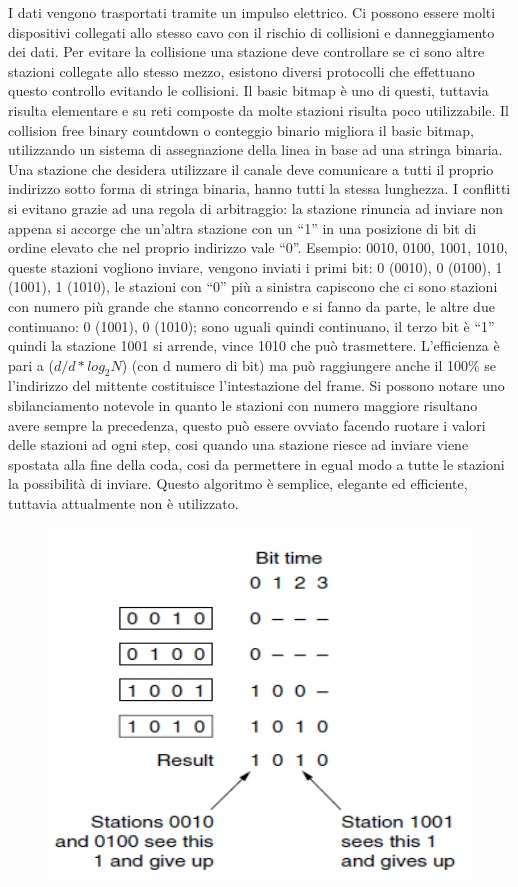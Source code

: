 I dati vengono trasportati tramite un impulso elettrico. Ci possono essere molti dispositivi collegati allo stesso cavo con il rischio di collisioni e danneggiamento dei dati.
Per evitare la collisione una stazione deve controllare se ci sono altre stazioni collegate allo stesso mezzo, esistono diversi protocolli che effettuano questo controllo evitando le collisioni.
Il basic bitmap è uno di questi, tuttavia risulta elementare e su reti composte da molte stazioni risulta poco utilizzabile.
Il collision free binary countdown o conteggio binario migliora il basic bitmap, utilizzando un sistema di assegnazione della linea in base ad una stringa binaria.
Una stazione che desidera utilizzare il canale deve comunicare a tutti il proprio indirizzo sotto forma di stringa binaria, hanno tutti la stessa lunghezza.
I conflitti si evitano grazie ad una regola di arbitraggio: la stazione rinuncia ad inviare non appena si accorge che un’altra stazione con un “1” in una posizione di bit di ordine elevato che nel proprio indirizzo vale “0”.
Esempio: 0010, 0100, 1001, 1010, queste stazioni vogliono inviare, vengono inviati i primi bit: 0 (0010), 0 (0100), 1 (1001), 1 (1010), le stazioni con “0” più a sinistra capiscono che ci sono stazioni con numero più grande che stanno concorrendo e si fanno da parte, le altre due continuano: 0 (1001), 0 (1010); sono uguali quindi continuano, il terzo bit è “1” quindi la stazione 1001 si arrende, vince 1010 che può trasmettere.
L’efficienza è pari a ($d/d*log_2N$) (con d numero di bit) ma può raggiungere anche il 100\% se l’indirizzo del mittente costituisce l’intestazione del frame.
Si possono notare uno sbilanciamento notevole in quanto le stazioni con numero maggiore risultano avere sempre la precedenza, questo può essere ovviato facendo ruotare i valori delle stazioni ad ogni step, cosi quando una stazione riesce ad inviare viene spostata alla fine della coda, cosi da permettere in egual modo a tutte le stazioni la possibilità di inviare.
Questo algoritmo è semplice, elegante ed efficiente, tuttavia attualmente non è utilizzato.

\begin{figure}[H]
\centering
\includegraphics[scale=0.6]{res/img/25_FreeBinaryCountdown.png}
\end{figure} 

